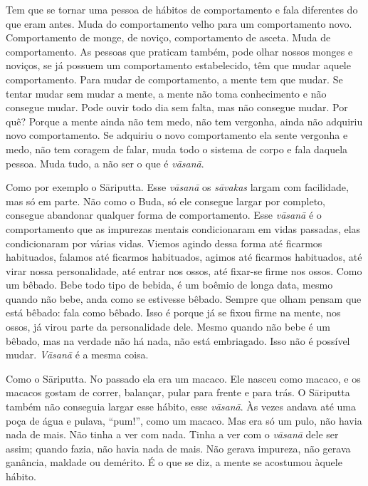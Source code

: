Tem que se tornar uma pessoa de hábitos de comportamento e fala
diferentes do que eram antes. Muda do comportamento velho para um
comportamento novo. Comportamento de monge, de noviço, comportamento de
asceta. Muda de comportamento. As pessoas que praticam também, pode
olhar nossos monges e noviços, se já possuem um comportamento
estabelecido, têm que mudar aquele comportamento. Para mudar de
comportamento, a mente tem que mudar. Se tentar mudar sem mudar a
mente, a mente não toma conhecimento e não consegue mudar. Pode ouvir
todo dia sem falta, mas não consegue mudar. Por quê? Porque a mente
ainda não tem medo, não tem vergonha, ainda não adquiriu novo
comportamento. Se adquiriu o novo comportamento ela sente vergonha e
medo, não tem coragem de falar, muda todo o sistema de corpo e fala
daquela pessoa. Muda tudo, a não ser o que é \textit{v\=asan\=a}. 

Como por exemplo o S\=ariputta. Esse \textit{v\=asan\=a} os
\textit{s\=avakas} largam com facilidade, mas só em parte. Não como o
Buda, só ele consegue largar por completo, consegue abandonar qualquer
forma de comportamento. Esse \textit{v\=asan\=a} é o comportamento que
as impurezas mentais condicionaram em vidas passadas, elas
condicionaram por várias vidas. Viemos agindo dessa forma até ficarmos
habituados, falamos até ficarmos habituados, agimos até ficarmos
habituados, até virar nossa personalidade, até entrar nos ossos, até
fixar-se firme nos ossos. Como um bêbado. Bebe todo tipo de bebida, é
um boêmio de longa data, mesmo quando não bebe, anda como se estivesse
bêbado. Sempre que olham pensam que está bêbado: fala como bêbado. Isso
é porque já se fixou firme na mente, nos ossos, já virou parte da
personalidade dele. Mesmo quando não bebe é um bêbado, mas na verdade
não há nada, não está embriagado. Isso não é possível mudar.
\textit{V\=asan\=a} é a mesma coisa. 

Como o S\=ariputta. No passado ela era um macaco. Ele nasceu como
macaco, e os macacos gostam de correr, balançar, pular para frente e
para trás. O S\=ariputta também não conseguia largar esse hábito, esse
\textit{v\=asan\=a}. Às vezes andava até uma poça de água e pulava,
“pum!”, como um macaco. Mas era só um pulo, não havia nada de mais. Não
tinha a ver com nada. Tinha a ver com o \textit{v\=asan\=a} dele ser
assim; quando fazia, não havia nada de mais. Não gerava impureza, não
gerava ganância, maldade ou demérito. É o que se diz, a mente se
acostumou àquele hábito. 

